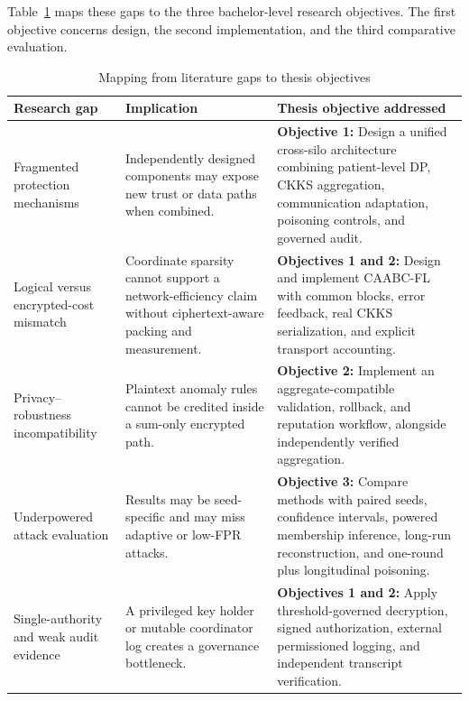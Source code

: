 Table~\ref{tab:gap-objective-map} maps these gaps to the three bachelor-level research objectives. The first objective concerns design, the second implementation, and the third comparative evaluation.

\begin{table}[htbp]
\centering
\caption{Mapping from literature gaps to thesis objectives}
\label{tab:gap-objective-map}
\small
\begin{tabularx}{\textwidth}{@{}p{2.55cm}X X@{}}
\toprule
Research gap & Implication & Thesis objective addressed \\
\midrule
Fragmented protection mechanisms & Independently designed components may expose new trust or data paths when combined. & \textbf{Objective 1:} Design a unified cross-silo architecture combining patient-level DP, CKKS aggregation, communication adaptation, poisoning controls, and governed audit. \\
Logical versus encrypted-cost mismatch & Coordinate sparsity cannot support a network-efficiency claim without ciphertext-aware packing and measurement. & \textbf{Objectives 1 and 2:} Design and implement CAABC-FL with common blocks, error feedback, real CKKS serialization, and explicit transport accounting. \\
Privacy--robustness incompatibility & Plaintext anomaly rules cannot be credited inside a sum-only encrypted path. & \textbf{Objective 2:} Implement an aggregate-compatible validation, rollback, and reputation workflow, alongside independently verified aggregation. \\
Underpowered attack evaluation & Results may be seed-specific and may miss adaptive or low-FPR attacks. & \textbf{Objective 3:} Compare methods with paired seeds, confidence intervals, powered membership inference, long-run reconstruction, and one-round plus longitudinal poisoning. \\
Single-authority and weak audit evidence & A privileged key holder or mutable coordinator log creates a governance bottleneck. & \textbf{Objectives 1 and 2:} Apply threshold-governed decryption, signed authorization, external permissioned logging, and independent transcript verification. \\
\bottomrule
\end{tabularx}
\end{table}

